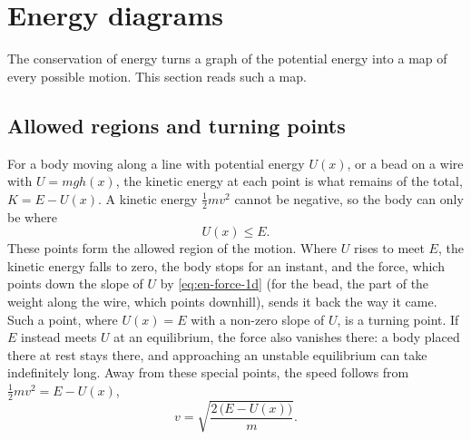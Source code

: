 \section{Energy diagrams}
\label{sec:en-diagrams}

The conservation of energy turns a graph of the potential energy into a
map of every possible motion. This section reads such a map.

\subsection*{Allowed regions and turning points}

For a body moving along a line with potential energy $U(x)$, or a bead on
a wire with $U = mgh(x)$, the kinetic energy at each point is what
remains of the total, $K = E - U(x)$. A kinetic energy $\frac12 mv^2$
cannot be negative, so the body can only be where
\begin{equation*}
   U(x) \le E .
\end{equation*}
These points form the allowed region of the motion. Where $U$ rises to
meet $E$, the kinetic energy falls to zero, the body stops for an
instant, and the force, which points down the slope of $U$ by
\cref{eq:en-force-1d} (for the bead, the part of the weight along the
wire, which points downhill), sends it back the way it came. Such a point, where
$U(x) = E$ with a non-zero slope of $U$, is a turning point. If $E$ instead
meets $U$ at an equilibrium, the force also vanishes there: a body placed
there at rest stays there, and approaching an unstable equilibrium can
take indefinitely long. Away from these special points, the speed follows
from $\frac12 mv^2 = E - U(x)$,
\begin{equation*}
   v = \sqrt{\frac{2\,\bigl(E - U(x)\bigr)}{m}} .
\end{equation*}

